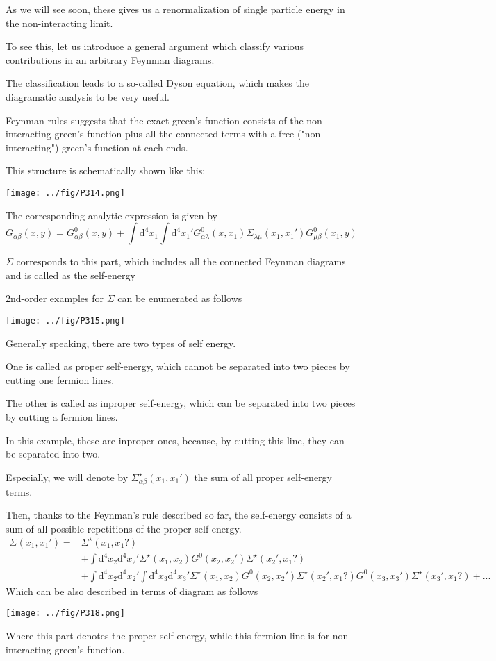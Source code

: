 As we will see soon, these gives us a renormalization of single particle energy in the non-interacting limit.

To see this, let us introduce a general argument which classify various contributions in an arbitrary Feynman diagrams.

The classification leads to a so-called Dyson equation, which makes the diagramatic analysis to be very useful.

Feynman rules suggests that the exact green's function consists of the non-interacting green's function plus all the connected terms with a free ("non-interacting") green's function at each ends.

This structure is schematically shown like this:
\begin{center}
\texttt{[image: ../fig/P314.png]}
\end{center}
The corresponding analytic expression is given by
$$G_{\alpha\beta}(x,y)=G_{\alpha\beta}^0(x,y)+\int \mathrm{d}^4x_1\int \mathrm{d}^4x_1'G_{\alpha\lambda}^0(x,x_1)\Sigma_{\lambda\mu}(x_1,x_1')G_{\mu\beta}^0(x_1,y)$$

$\Sigma$ corresponds to this part, which includes all the connected Feynman diagrams and is called as the self-energy

2nd-order examples for $\Sigma$ can be enumerated as follows
\begin{center}
\texttt{[image: ../fig/P315.png]}
\end{center}
Generally speaking, there are two types of self energy.

One is called as proper self-energy, which cannot be separated into two  pieces by cutting one fermion lines.

The other is called as inproper  self-energy, which can be separated into two pieces by cutting a fermion lines.

In this example, these are inproper ones, because, by cutting this line, they can be separated into two.

Especially, we will denote by $\Sigma^{\star}_{\alpha\beta}(x_1,x_1')$ the sum of all proper self-energy terms.

Then, thanks to the Feynman's rule described so far, the self-energy consists of a sum of all possible repetitions of the proper self-energy.
\begin{align}
\Sigma(x_1,x_1')=&\Sigma^{\star}(x_1,x_1?) \nonumber \\
&+\int \mathrm{d}^4x_2\mathrm{d}^4x_2'\Sigma^{\star}(x_1,x_2)G^0(x_2,x_2')\Sigma^{\star}(x_2',x_1?) \nonumber \\
&+\int \mathrm{d}^4x_2\mathrm{d}^4x_2'\int \mathrm{d}^4x_3\mathrm{d}^4x_3'\Sigma^{\star}(x_1,x_2)G^0(x_2,x_2')\Sigma^{\star}(x_2',x_1?)G^0(x_3,x_3')\Sigma^{\star}(x_3',x_1?)+... \nonumber
\end{align}
Which can be also described in terms of diagram as follows 
\begin{center}
\texttt{[image: ../fig/P318.png]}
\end{center}
Where this part denotes the proper self-energy, while this fermion line is for non-interacting green's function.

